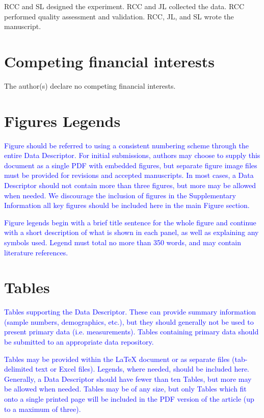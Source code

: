 \documentclass[english,11pt]{article}
\begin{document}
RCC and SL designed the experiment. RCC and JL collected the data. RCC performed 
quality assessment and validation. RCC, JL, and SL wrote the manuscript.

\section*{Competing financial interests }

The author(s) declare no competing financial interests.


\section*{Figures Legends}

\textcolor{blue}{Figure should be referred to using a consistent numbering scheme through
the entire Data Descriptor. For initial submissions, authors may choose
to supply this document as a single PDF with embedded figures, but
separate figure image files must be provided for revisions and accepted
manuscripts. In most cases, a Data Descriptor should not contain more
than three figures, but more may be allowed when needed. We discourage
the inclusion of figures in the Supplementary Information \textendash{}
all key figures should be included here in the main Figure section. }

\textcolor{blue}{Figure legends begin with a brief title sentence for the whole figure
and continue with a short description of what is shown in each panel,
as well as explaining any symbols used. Legend must total no more
than 350 words, and may contain literature references. }


\section*{Tables}

\textcolor{blue}{Tables supporting the Data Descriptor. These can provide summary information
(sample numbers, demographics, etc.), but they should generally not
be used to present primary data (i.e. measurements). Tables containing
primary data should be submitted to an appropriate data repository. }

\textcolor{blue}{Tables may be provided within the \LaTeX{} document or as separate
files (tab-delimited text or Excel files). Legends, where needed,
should be included here. Generally, a Data Descriptor should have
fewer than ten Tables, but more may be allowed when needed. Tables
may be of any size, but only Tables which fit onto a single printed
page will be included in the PDF version of the article (up to a maximum
of three). }
\end{document}
